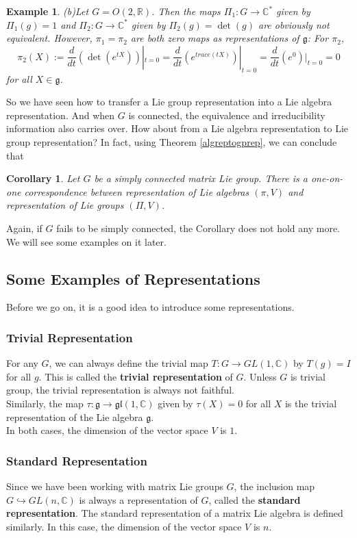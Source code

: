 \documentclass[11pt]{article}
\newtheorem{corollary}[theorem]{Corollary}
\newtheorem{example}[theorem]{Example}
\newcommand{\bb}[1]{\mathbb{#1}}
\newcommand{\mf}[1]{\mathfrak{#1}}
\begin{document}
\begin{example}
\noindent (b)Let $G = O(2,\bb{R})$. Then the maps $\Pi_1: G \to \bb{C}^*$ given by $\Pi_1(g) = 1$ and $\Pi_2: G \to \bb{C}^*$ given by $\Pi_2(g) = \det(g)$ are obviously not equivalent. However, $\pi_1 = \pi_2$ are both zero maps as representations of $\mf{g}$: For $\pi_2$,
$$\pi_2(X) := \frac{d}{dt}(\det(e^{tX}))|_{t=0} = \frac{d}{dt}(e^{trace(tX)})|_{t=0} = \frac{d}{dt}(e^0)|_{t=0} = 0$$
for all $X \in \mf{g}$.


\end{example}


So we have seen how to transfer a Lie group representation into a Lie algebra representation. And when $G$ is connected, the equivalence and irreducibility information also carries over. How about from a Lie algebra representation to Lie group representation? In fact, using Theorem \ref{algreptogprep}, we can conclude that
\begin{corollary}
Let $G$ be a simply connected matrix Lie group. There is a one-on-one correspondence between representation of Lie algebras $(\pi,V)$ and representation of Lie groups $(\Pi,V)$.
\end{corollary}
Again, if $G$ fails to be simply connected, the Corollary does not hold any more. We will see some examples on it later.

\subsection{Some Examples of Representations}
Before we go on, it is a good idea to introduce some representations.
\subsubsection{Trivial Representation}
For any $G$, we can always define the trivial map $T: G \to GL(1,\bb{C})$ by $T(g) = I$ for all $g$. This is called the \textbf{trivial representation} of $G$. Unless $G$ is trivial group, the trivial representation is always not faithful.\\
Similarly, the map $\tau: \mf{g} \to \mf{gl}(1,\bb{C})$ given by $\tau(X) = 0$ for all $X$ is the trivial representation of the Lie algebra $\mf{g}$.\\
In both cases, the dimension of the vector space $V$ is $1$.
\subsubsection{Standard Representation}
Since we have been working with matrix Lie groups $G$, the inclusion map $G \hookrightarrow GL(n,\bb{C})$ is always a representation of $G$, called the \textbf{standard representation}. The standard representation of a matrix Lie algebra is defined similarly.
In this case, the dimension of the vector space $V$ is $n$.
\end{document}
